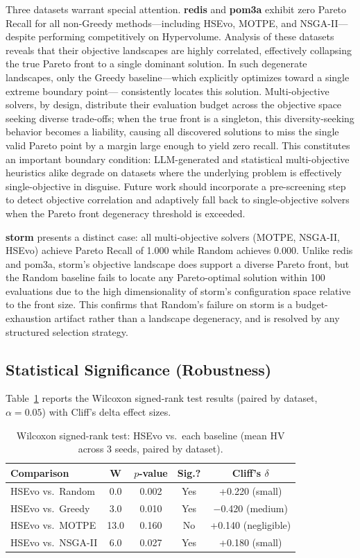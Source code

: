 \documentclass[sigconf,nonacm]{acmart}
\begin{document}
Three datasets warrant special attention. \textbf{redis} and
\textbf{pom3a} exhibit zero Pareto Recall for all non-Greedy
methods—including HSEvo, MOTPE, and NSGA-II—despite performing
competitively on Hypervolume. Analysis of these datasets reveals
that their objective landscapes are highly correlated, effectively
collapsing the true Pareto front to a single dominant solution.
In such degenerate landscapes, only the Greedy baseline—which
explicitly optimizes toward a single extreme boundary point—
consistently locates this solution. Multi-objective solvers, by
design, distribute their evaluation budget across the objective
space seeking diverse trade-offs; when the true front is a
singleton, this diversity-seeking behavior becomes a liability,
causing all discovered solutions to miss the single valid Pareto
point by a margin large enough to yield zero recall. This
constitutes an important boundary condition: LLM-generated and
statistical multi-objective heuristics alike degrade on datasets
where the underlying problem is effectively single-objective in
disguise. Future work should incorporate a pre-screening step to
detect objective correlation and adaptively fall back to
single-objective solvers when the Pareto front degeneracy
threshold is exceeded.

\textbf{storm} presents a distinct case: all multi-objective
solvers (MOTPE, NSGA-II, HSEvo) achieve Pareto Recall of 1.000
while Random achieves 0.000. Unlike redis and pom3a, storm's
objective landscape does support a diverse Pareto front, but
the Random baseline fails to locate any Pareto-optimal solution
within 100 evaluations due to the high dimensionality of storm's
configuration space relative to the front size. This confirms
that Random's failure on storm is a budget-exhaustion artifact
rather than a landscape degeneracy, and is resolved by any
structured selection strategy.

\subsection{Statistical Significance (Robustness)}
Table~\ref{tab:wilcoxon} reports the Wilcoxon signed-rank test results (paired by dataset, $\alpha=0.05$) with Cliff's delta effect sizes.

\begin{table}[h]
\caption{Wilcoxon signed-rank test: HSEvo vs.\ each baseline (mean HV across 3 seeds, paired by dataset).}
\label{tab:wilcoxon}
\begin{tabular}{lcccc}
\toprule
\textbf{Comparison} & \textbf{W} & \textbf{$p$-value} & \textbf{Sig.?} & \textbf{Cliff's $\delta$} \\
\midrule
HSEvo vs.\ Random  & 0.0  & 0.002 & Yes & +0.220 (small) \\
HSEvo vs.\ Greedy  & 3.0  & 0.010 & Yes & $-$0.420 (medium) \\
HSEvo vs.\ MOTPE   & 13.0 & 0.160 & No  & +0.140 (negligible) \\
HSEvo vs.\ NSGA-II & 6.0  & 0.027 & Yes & +0.180 (small) \\
\bottomrule
\end{tabular}
\end{table}
\end{document}
